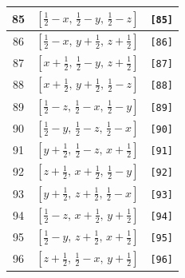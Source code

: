 \documentclass[fleqn,8pt]{jsarticle}
\begin{document}
\begin{longtable}{ccc}
85 & $\left[ \frac{1}{2} - x,\, \frac{1}{2} - y,\, \frac{1}{2} - z \right]$ & {\tt [85]} \\ \hline
86 & $\left[ \frac{1}{2} - x,\, y + \frac{1}{2},\, z + \frac{1}{2} \right]$ & {\tt [86]} \\ \hline
87 & $\left[ x + \frac{1}{2},\, \frac{1}{2} - y,\, z + \frac{1}{2} \right]$ & {\tt [87]} \\ \hline
88 & $\left[ x + \frac{1}{2},\, y + \frac{1}{2},\, \frac{1}{2} - z \right]$ & {\tt [88]} \\ \hline
89 & $\left[ \frac{1}{2} - z,\, \frac{1}{2} - x,\, \frac{1}{2} - y \right]$ & {\tt [89]} \\ \hline
90 & $\left[ \frac{1}{2} - y,\, \frac{1}{2} - z,\, \frac{1}{2} - x \right]$ & {\tt [90]} \\ \hline
91 & $\left[ y + \frac{1}{2},\, \frac{1}{2} - z,\, x + \frac{1}{2} \right]$ & {\tt [91]} \\ \hline
92 & $\left[ z + \frac{1}{2},\, x + \frac{1}{2},\, \frac{1}{2} - y \right]$ & {\tt [92]} \\ \hline
93 & $\left[ y + \frac{1}{2},\, z + \frac{1}{2},\, \frac{1}{2} - x \right]$ & {\tt [93]} \\ \hline
94 & $\left[ \frac{1}{2} - z,\, x + \frac{1}{2},\, y + \frac{1}{2} \right]$ & {\tt [94]} \\ \hline
95 & $\left[ \frac{1}{2} - y,\, z + \frac{1}{2},\, x + \frac{1}{2} \right]$ & {\tt [95]} \\ \hline
96 & $\left[ z + \frac{1}{2},\, \frac{1}{2} - x,\, y + \frac{1}{2} \right]$ & {\tt [96]} \\
\end{longtable}
\end{document}
